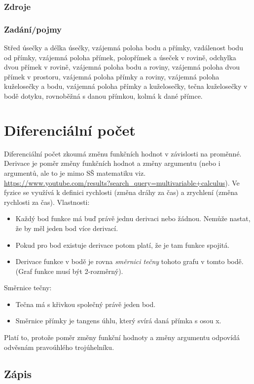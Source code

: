 \documentclass[12pt]{article}
\begin{document}
\subsubsection{Zdroje}
\subsubsection{Zadání/pojmy}
Střed úsečky a délka úsečky, vzájemná poloha bodu a přímky, vzdálenost bodu od přímky, vzájemná poloha přímek, polopřímek a úseček v rovině, odchylka dvou přímek v rovině, vzájemná poloha bodu a roviny, vzájemná poloha dvou přímek v prostoru, vzájemná poloha přímky a roviny, vzájemná poloha kuželosečky a bodu, vzájemná poloha přímky a kuželosečky, tečna kuželosečky v bodě dotyku, rovnoběžná s danou přímkou, kolmá k dané přímce.

\section{Diferenciální počet}
Diferenciální počet zkoumá změnu funkčních hodnot v závislosti na proměnné. Derivace je poměr změny funkčních hodnot a změny argumentu (nebo i argumentů, ale to je mimo SŠ matematiku viz. \url{https://www.youtube.com/results?search_query=multivariable+calculus}). Ve fyzice se využívá k definici rychlosti (změna dráhy za čas) a zrychlení (změna rychlosti za čas).
Vlastnosti:
\begin{itemize}
\item Každý bod funkce má buď právě jednu derivaci nebo žádnou. Nemůže nastat, že by měl jeden bod více derivací.
\item Pokud pro bod existuje derivace potom platí, že je tam funkce spojitá.
\item Derivace funkce v bodě je rovna \emph{směrnici tečny} tohoto grafu v tomto bodě. (Graf funkce musí být 2-rozměrný).
\end{itemize}
Směrnice tečny:
\begin{itemize}
\item Tečna má s křivkou společný právě jeden bod. 
\item Směrnice přímky je tangens úhlu, který svírá daná přímka s osou x.
\end{itemize}
Platí to, protože poměr změny funkční hodnoty a změny argumentu odpovídá odvěsnám pravoúhlého trojúhelníku.
\subsection{Zápis}
\end{document}
